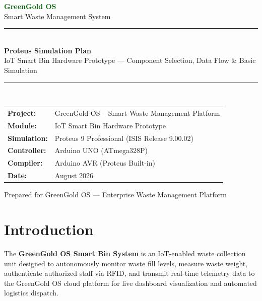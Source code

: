 \documentclass[12pt,a4paper]{article}
\begin{document}
\begin{titlepage}
\centering
\vspace*{1cm}

{\Huge\bfseries\textcolor{darkgreen}{GreenGold OS}}\\[0.5cm]
{\Large\textcolor{greengold}{Smart Waste Management System}}\\[2cm]

\rule{\textwidth}{2pt}\\[0.5cm]
{\LARGE\bfseries Proteus Simulation Plan}\\[0.3cm]
{\large IoT Smart Bin Hardware Prototype --- Component Selection, Data Flow \& Basic Simulation}\\[0.5cm]
\rule{\textwidth}{2pt}\\[2cm]

\begin{tabular}{ll}
\textbf{Project:}     & GreenGold OS -- Smart Waste Management Platform \\
\textbf{Module:}       & IoT Smart Bin Hardware Prototype \\
\textbf{Simulation:}   & Proteus 9 Professional (ISIS Release 9.00.02) \\
\textbf{Controller:}   & Arduino UNO (ATmega328P) \\
\textbf{Compiler:}     & Arduino AVR (Proteus Built-in) \\
\textbf{Date:}         & August 2026 \\
\end{tabular}

\vfill
{\small Prepared for GreenGold OS --- Enterprise Waste Management Platform}
\end{titlepage}

\tableofcontents
\newpage

\section{Introduction}

The \textbf{GreenGold OS Smart Bin System} is an IoT-enabled waste collection unit designed to autonomously monitor waste fill levels, measure waste weight, authenticate authorized staff via RFID, and transmit real-time telemetry data to the GreenGold OS cloud platform for live dashboard visualization and automated logistics dispatch.
\end{document}
